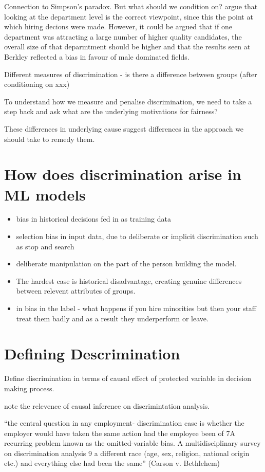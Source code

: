 \documentclass[11pt,a4paper,oneside]{book}
\theoremstyle{plain}
\theoremstyle{definition}
\begin{document}
Connection to Simpson's paradox. But what should we condition on? \cite{Romie2010} argue that looking at the department level is the correct viewpoint, since this the point at which hiring decions were made. However, it could be argued that if one department was attracting a large number of higher quality candidates, the overall size of that deparmtment should be higher and that the results seen at Berkley reflected a bias in favour of male dominated fields. 

Different measures of discrimination - is there a difference between groups (after conditioning on xxx)

To understand how we measure and penalise discrimination, we need to take a step back and ask what are the underlying motivations for fairness?

These differences in underlying cause suggest differences in the approach we should take to remedy them.  

\section{How does discrimination arise in ML models}
\begin{itemize}
\item bias in historical decisions fed in as training data
\item selection bias in input data, due to deliberate or implicit discrimination such as stop and search
\item deliberate manipulation on the part of the person building the model.
\item The hardest case is historical disadvantage, creating genuine differences between relevent attributes of groups.
\item in bias in the label - what happens if you hire minorities but then your staff treat them badly and as a result they underperform or leave.  
\end{itemize}

\section{Defining Descrimination}

Define discrimination in terms of causal effect of protected variable in decision making process. 

\cite{Romei2012} note the relevence of causal inference on discrimintation analysis.

“the central question in any employment- discrimination case is whether the employer would have taken the same action had the employee been of 7A recurring problem known as the omitted-variable bias.
A multidisciplinary survey on discrimination analysis 9
a different race (age, sex, religion, national origin etc.) and everything else had been the same” (Carson v. Bethlehem)
\end{document}
